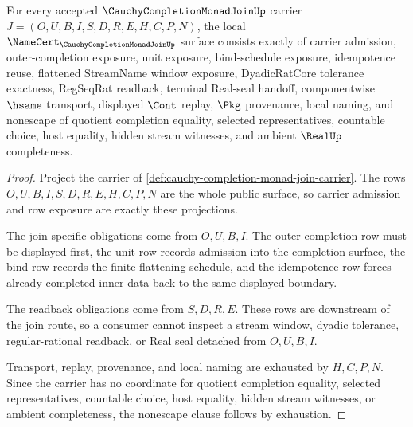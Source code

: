 \begin{theorem}
\label{thm:cauchy-completion-monad-join-namecert-obligations}
For every accepted $\CauchyCompletionMonadJoinUp$ carrier $J=(O,U,B,I,S,D,R,E,H,C,P,N)$, the local $\NameCert_{\CauchyCompletionMonadJoinUp}$ surface consists exactly of carrier admission, outer-completion exposure, unit exposure, bind-schedule exposure, idempotence reuse, flattened StreamName window exposure, DyadicRatCore tolerance exactness, RegSeqRat readback, terminal Real-seal handoff, componentwise $\hsame$ transport, displayed $\Cont$ replay, $\Pkg$ provenance, local naming, and nonescape of quotient completion equality, selected representatives, countable choice, host equality, hidden stream witnesses, and ambient $\RealUp$ completeness.
\end{theorem}
\begin{proof}
Project the carrier of \autoref{def:cauchy-completion-monad-join-carrier}. The rows $O,U,B,I,S,D,R,E,H,C,P,N$ are the whole public surface, so carrier admission and row exposure are exactly these projections.

The join-specific obligations come from $O,U,B,I$. The outer completion row must be displayed first, the unit row records admission into the completion surface, the bind row records the finite flattening schedule, and the idempotence row forces already completed inner data back to the same displayed boundary.

The readback obligations come from $S,D,R,E$. These rows are downstream of the join route, so a consumer cannot inspect a stream window, dyadic tolerance, regular-rational readback, or Real seal detached from $O,U,B,I$.

Transport, replay, provenance, and local naming are exhausted by $H,C,P,N$. Since the carrier has no coordinate for quotient completion equality, selected representatives, countable choice, host equality, hidden stream witnesses, or ambient completeness, the nonescape clause follows by exhaustion.
\end{proof}

